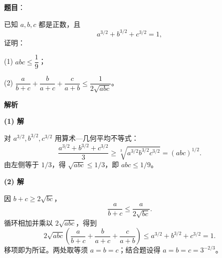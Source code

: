\begin{answer}

\textbf{题目}：

已知 $a,b,c$ 都是正数，且
\nopagebreak[4]
\[
a^{3/2}+b^{3/2}+c^{3/2}=1,
\]
证明：

(1) $abc\le\dfrac19$；

(2) $\dfrac{a}{b+c}+\dfrac{b}{a+c}+\dfrac{c}{a+b}\le\dfrac{1}{2\sqrt{abc}}$。

\textbf{解析}

\textbf{(1) 解}

对 $a^{3/2},b^{3/2},c^{3/2}$ 用算术—几何平均不等式：
\nopagebreak[4]
\[
\frac{a^{3/2}+b^{3/2}+c^{3/2}}3
\ge\sqrt[3]{a^{3/2}b^{3/2}c^{3/2}}
=(abc)^{1/2}.
\]
由左侧等于 $1/3$，得 $\sqrt{abc}\le1/3$，即 $abc\le1/9$。

\textbf{(2) 解}

因 $b+c\ge2\sqrt{bc}$，
\nopagebreak[4]
\[
\frac{a}{b+c}\le\frac{a}{2\sqrt{bc}}.
\]
循环相加并乘以 $2\sqrt{abc}$，得到
\nopagebreak[4]
\[
2\sqrt{abc}\left(\frac a{b+c}+\frac b{a+c}+\frac c{a+b}\right)
\le a^{3/2}+b^{3/2}+c^{3/2}=1.
\]
移项即为所证。两处取等须 $a=b=c$；结合题设得 $a=b=c=3^{-2/3}$。



\end{answer}